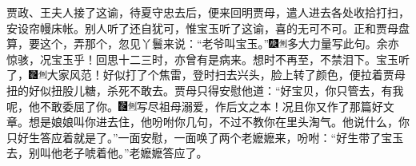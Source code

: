贾政、王夫人接了这谕，待夏守忠去后，便来回明贾母，遣人进去各处收拾打扫，安设帘幔床帐。别人听了还自犹可，惟宝玉听了这谕，喜的无可不可。正和贾母盘算，要这个，弄那个，忽见丫鬟来说：``老爷叫宝玉。''{\includegraphics[width=3mm]{../Images/00004}\includegraphics[width=3mm]{../Images/00011}\footnotesize \kaishu 多大力量写此句。余亦惊骇，况宝玉乎！回思十二三时，亦曾有是病来。想时不再至，不禁泪下。}宝玉听了，{\includegraphics[width=3mm]{../Images/00006}\includegraphics[width=3mm]{../Images/00011}\footnotesize \kaishu 大家风范！}好似打了个焦雷，登时扫去兴头，脸上转了颜色，便拉着贾母扭的好似扭股儿糖，杀死不敢去。贾母只得安慰他道：``好宝贝，你只管去，有我呢，他不敢委屈了你。{\includegraphics[width=3mm]{../Images/00006}\includegraphics[width=3mm]{../Images/00011}\footnotesize \kaishu 写尽祖母溺爱，作后文之本！}况且你又作了那篇好文章。想是娘娘叫你进去住，他吩咐你几句，不过不教你在里头淘气。他说什么，你只好生答应着就是了。''一面安慰，一面唤了两个老嬷嬷来，吩咐：``好生带了宝玉去，别叫他老子唬着他。''老嬷嬷答应了。

